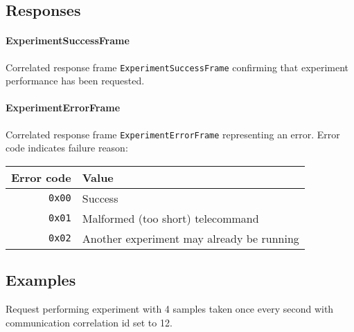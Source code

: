 \subsection{Responses}
\paragraph{ExperimentSuccessFrame}

Correlated response frame \texttt{ExperimentSuccessFrame} confirming 
that \detumbling experiment performance has been requested.

\paragraph{ExperimentErrorFrame}
Correlated response frame \texttt{ExperimentErrorFrame} representing an error. 
Error code indicates failure reason:

\begin{tabular}{r | l}
    Error code & Value \\
    \hline
    \texttt{0x00}   & Success \\
    \texttt{0x01}   & Malformed (too short) telecommand \\
    \texttt{0x02}   & Another experiment may already be running \\
\end{tabular}

\subsection{Examples}
Request performing \detumbling experiment with 4 samples taken once every second with communication correlation id set to 12.

